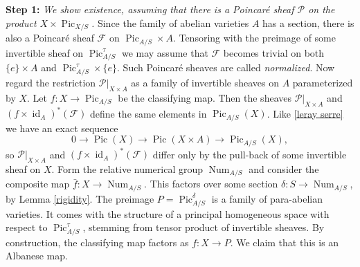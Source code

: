 \documentclass[oneside, 12pt]{amsart}
\theoremstyle{definition}
\theoremstyle{remark}
\newcommand{\shF}{\mathscr{F}}
\newcommand{\shP}{\mathscr{P}}
\newcommand{\id}{{\operatorname{id}}}
\newcommand{\lra}{\longrightarrow}
\newcommand{\Num}{\operatorname{Num}}
\newcommand{\Pic}{\operatorname{Pic}}
\newcommand{\ra}{\rightarrow}
\begin{document}
\medskip
{\bf Step 1:}
\emph{We show existence, assuming that there is a  Poincar\'e sheaf $\shP$ on the product $X\times\Pic_{X/S}$.} 
Since the family of abelian varieties $A$ has a section, there is also a Poincar\'e sheaf $\shF$ on $ \Pic_{A/S}\times A$.
Tensoring with the preimage of some invertible sheaf on $\Pic^\tau_{A/S}$ we may assume
that $\shF$ becomes trivial on both $\{e\}\times A$ and $\Pic^\tau_{A/S}\times\{e\}$.
Such Poincar\'e sheaves are called \emph{normalized}.
Now regard the restriction $\shP|_{X\times A}$ as a family of invertible sheaves on  
$A$  parameterized by  $X$.
Let $f:X\ra\Pic_{A/S}$ be the classifying map. Then the sheaves
$\shP|_{X\times A}$ and $(f\times\id_A)^*(\shF)$ define the same elements in $\Pic_{A/S}(X)$.
Like \eqref{leray serre} we have an exact sequence
$$
0\lra \Pic(X)\lra\Pic(X\times A)\lra \Pic_{A/S}(X),
$$
so  $\shP|_{X\times A}$ and $(f\times\id_A)^*(\shF)$ differ only by 
the pull-back of some  invertible sheaf on $X$.
Form the relative numerical group  $\Num_{A/S}$ and consider the composite map $\bar{f}:X\ra\Num_{A/S}$.
This   factors over some section $\delta:S\ra\Num_{A/S}$, by Lemma \ref{rigidity}.
The preimage $P=\Pic^\delta_{A/S}$ is a family of para-abelian varieties. It   comes with the structure of a principal homogeneous space
with respect to   $\Pic^\tau_{A/S}$, 
stemming from tensor product of invertible sheaves.
By construction, the classifying map 
factors as  $f:X\ra P$. We claim that this is an Albanese map. 
\end{document}
